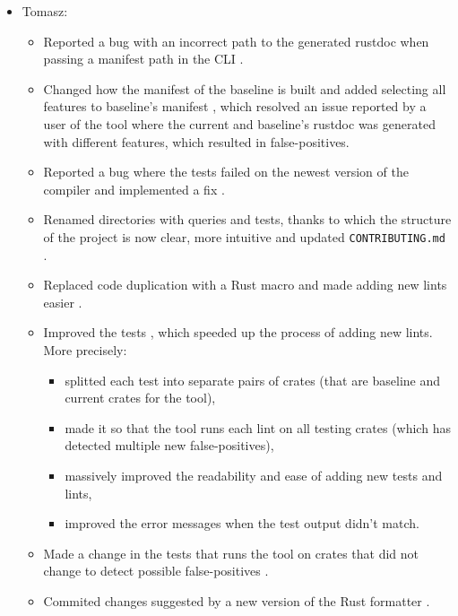 \documentclass[licencjacka,en]{pracamgr}
\begin{document}
\begin{itemize}
	\item Tomasz:
		\begin{itemize}
			\item Reported a bug with an incorrect path to the generated rustdoc when passing
				a manifest path in the CLI \cite{issue_wrong_path_manifest_path}.
			\item Changed how the manifest of the baseline is built and added
				selecting all features to baseline's manifest \cite{pr_changed_how_manifest_baseline_built},
				which resolved an issue reported by a user of the tool
				\cite{issue_baseline_rustdoc_from_registry_default_features}
				where the current and baseline's rustdoc was generated with different features,
				which resulted in false-positives.
			\item Reported a bug where the tests failed on the newest version
				of the compiler \cite{issue_tests_fail_on_nightly}
				and implemented a fix \cite{pr_tests_fail_on_nightly}.
			\item Renamed directories with queries and tests, thanks to which the
				structure of the project is now clear, more intuitive
				\cite{pr_renamed_directories} \cite{pr_renamed_directories_2}
				and updated \texttt{CONTRIBUTING.md} \cite{pr_renamed_directories_3}.
			\item Replaced code duplication with a Rust macro and made adding new
				lints easier \cite{pr_one_macro}.
			\item Improved the tests \cite{pr_split_each_test},
				which speeded up the process of adding new lints.
				More precisely:
				\begin{itemize}
					\item splitted each test into separate pairs of crates
						(that are baseline and current crates for the tool),
					\item made it so that the tool runs each lint on all testing crates
						(which has detected multiple new false-positives),
					\item massively improved the readability and ease of adding new tests and lints,
					\item improved the error messages when the test output didn't match.
				\end{itemize}
			\item Made a change in the tests that runs the tool on crates that did not change
				to detect possible false-positives \cite{pr_run_lints_nonchanged_crates}.
			\item Commited changes suggested by a new version of the Rust formatter \cite{pr_clippy_lint}.

\end{itemize}
\end{itemize}
\end{document}
